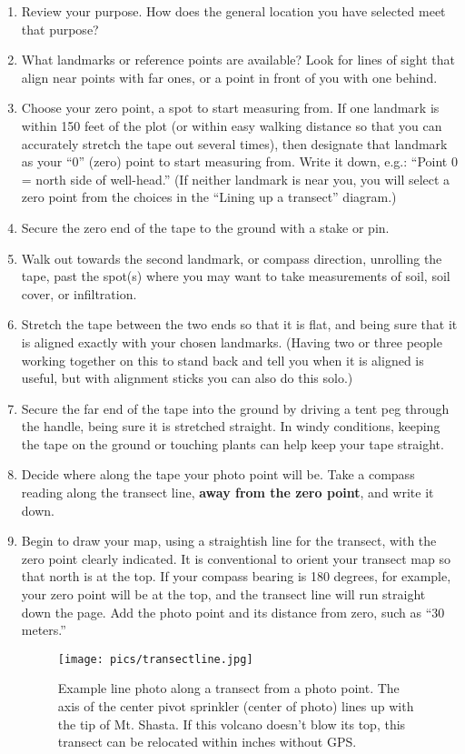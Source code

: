 \documentclass[11pt,letterpaper,twoside,onecolumn]{memoir}
\begin{document}
\begin{enumerate}
\item Review your purpose. How does the general location you have selected meet that purpose?

\item What landmarks or reference points are available? Look for lines of sight that align near points with far ones, or a point in front of you with one behind.

\item Choose your zero point, a spot to start measuring from. If one landmark is within 150 feet of the plot (or within easy walking distance so that you can accurately stretch the tape out several times), then designate that landmark as your ``0'' (zero) point to start measuring from. Write it down, e.g.: ``Point 0 = north side of well-head.'' (If neither landmark is near you, you will select a zero point from the choices in the ``Lining up a transect'' diagram.)

\item Secure the zero end of the tape to the ground with a stake or pin.

\item Walk out towards the second landmark, or compass direction, unrolling the tape, past the spot(s) where you may want to take measurements of soil, soil cover, or infiltration.
\item Stretch the tape between the two ends so that it is flat, and being sure that it is aligned exactly with your chosen landmarks. (Having two or three people working together on this to stand back and tell you when it is aligned is useful, but with alignment sticks you can also do this solo.)
\item Secure the far end of the tape into the ground by driving a tent peg through the handle, being sure it is stretched straight. In windy conditions, keeping the tape on the ground or touching plants can help keep your tape straight.
\item Decide where along the tape your photo point will be. Take a compass reading along the transect line, \textbf{away from the zero point}, and write it down.

\item Begin to draw your map, using a straightish line for the transect, with the zero point clearly indicated. It is conventional to orient your transect map so that north is at the top. If your compass bearing is 180 degrees, for example, your zero point will be at the top, and the transect line will run straight down the page. Add the photo point and its distance from zero, such as ``30 meters.''
\begin{figure}[h]
\centering
\begin{minipage}{.75\textwidth}
\texttt{[image: pics/transectline.jpg]}
\caption*{Example line photo along a transect from a photo point. The axis of the center pivot sprinkler (center of photo) lines up with the tip of Mt. Shasta. If this volcano doesn't blow its top, this transect can be relocated within inches without GPS.}
\end{minipage}
\end{figure}


\end{enumerate}
\end{document}
